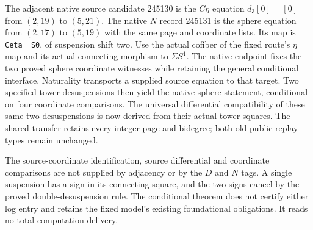 \begin{proposition}
  \label{prop:lin-native-naturality-245131}
  \notready
  The adjacent native source candidate 245130 is the $C\eta$ equation
  $d_3[0]=[0]$ from $(2,19)$ to $(5,21)$. The native $N$ record 245131 is
  the sphere equation from $(2,17)$ to $(5,19)$ with the same page and
  coordinate lists. Its map is \texttt{Ceta\_\_S0}, of suspension shift two.
  Use the actual cofiber of the fixed route's $\eta$ map and its actual
  connecting morphism to $\Sigma S^1$. The native endpoint fixes the two
  proved sphere coordinate witnesses while retaining the general conditional
  interface. Naturality transports a supplied
  source equation to that target. Two specified tower desuspensions then
  yield the native sphere statement, conditional on four coordinate
  comparisons. The universal differential compatibility of these same two
  desuspensions is now derived from their actual tower squares.
  The shared transfer retains every integer page and bidegree; both old
  public replay types remain unchanged.

  The source-coordinate identification, source differential and coordinate
  comparisons are not supplied by adjacency or by the $D$ and $N$ tags.
  A single suspension has a sign in its connecting square, and the two
  signs cancel by the proved double-desuspension rule. The conditional theorem
  does not certify either log entry and retains the fixed model's existing
  foundational obligations. It reads no total computation delivery.
\end{proposition}

